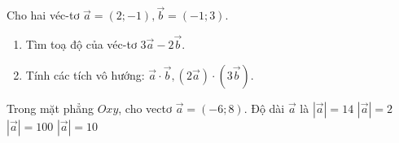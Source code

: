 \begin{bt}%
	Cho hai véc-tơ $\overrightarrow{a}=(2;-1),\overrightarrow{b}=(-1;3)$.
	\begin{enumerate}
		\item Tìm toạ độ của véc-tơ $3\overrightarrow{a}-2\overrightarrow{b}$.
		\item Tính các tích vô hướng: $\overrightarrow{a} \cdot \overrightarrow{b},(2\overrightarrow{a}) \cdot (3\overrightarrow{b})$.
	\end{enumerate}
\end{bt}

\begin{ex}%
	Trong mặt phẳng $Oxy$, cho vectơ $\overrightarrow{a}=(-6;8)$. Độ dài $\overrightarrow{a}$ là
	\choice
		{$|\overrightarrow{a}|=14$}
		{$|\overrightarrow{a}|=2$}
		{$|\overrightarrow{a}|=100$}
		{\True $|\overrightarrow{a}|=10$}
\end{ex}

